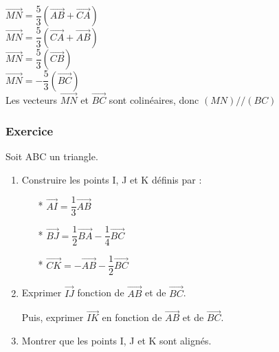 \begin{enumerate}
$ \overrightarrow{MN} = \dfrac{5}{3} \left(\overrightarrow{AB} + \overrightarrow{CA} \right)$\\

$ \overrightarrow{MN} = \dfrac{5}{3} \left(\overrightarrow{CA} + \overrightarrow{AB} \right)$\\

$ \overrightarrow{MN} = \dfrac{5}{3} \left(\overrightarrow{CB} \right)$\\

$ \overrightarrow{MN} = -\dfrac{5}{3} \left(\overrightarrow{BC}\right)$\\

Les vecteurs $\overrightarrow{MN}$ et $\overrightarrow{BC}$ sont colinéaires, donc $\left(MN\right)//\left(BC\right)$
\end{enumerate}
\newpage
\subsubsection{Exercice }

Soit ABC un triangle.

\begin{enumerate}


\item  Construire les points I, J et K définis par :

\begin{itemize}
\item[*] $\overrightarrow{AI} = \dfrac{1}{3} \overrightarrow{AB}$\\
\item[*] $\overrightarrow{BJ} = \dfrac{1}{2} \overrightarrow{BA} - \dfrac{1}{4} \overrightarrow{BC}$\\
\item[*] $\overrightarrow{CK} = -\overrightarrow{AB} - \dfrac{1}{2} \overrightarrow{BC}$\\
\end{itemize}

\item  Exprimer $\overrightarrow{IJ}$ fonction de $\overrightarrow{AB}$ et de $ \overrightarrow{BC}$. 

Puis, exprimer $\overrightarrow{IK}$ en fonction de $\overrightarrow{AB}$ et de $\overrightarrow{BC}$.

\item  Montrer que les points I, J et K sont alignés.

\end{enumerate}

~

